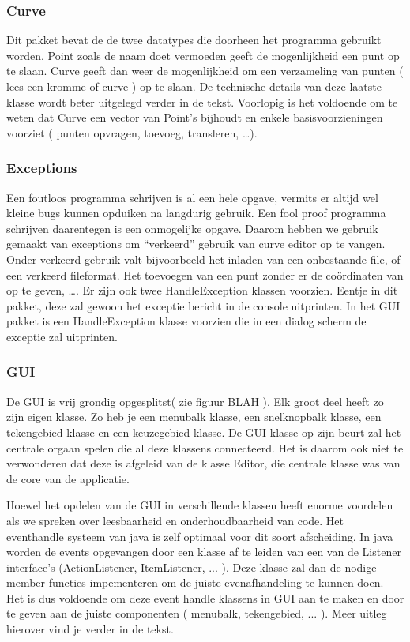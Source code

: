 \documentclass[a4paper,11pt,oneside, titlepage]{article}
\begin{document}
\subsubsection{Curve}
Dit pakket bevat de de twee datatypes die doorheen het programma gebruikt worden. Point zoals
de naam doet vermoeden geeft de mogenlijkheid een punt op te slaan. Curve geeft dan weer de
mogenlijkheid om een verzameling van punten ( lees een kromme of curve ) op te slaan. De
technische details van deze laatste klasse wordt beter uitgelegd verder in de tekst. 
Voorlopig is het voldoende om te weten dat Curve een vector van Point's bijhoudt en enkele
basisvoorzieningen voorziet ( punten opvragen, toevoeg, transleren, \ldots ).
\subsubsection{Exceptions}
Een foutloos programma schrijven is al een hele opgave, vermits er altijd wel kleine bugs
kunnen opduiken na langdurig gebruik. Een fool proof programma schrijven daarentegen is een
onmogelijke opgave. Daarom hebben we gebruik gemaakt van exceptions om ``verkeerd'' gebruik van
curve editor op te vangen. Onder verkeerd gebruik valt bijvoorbeeld het inladen van een
onbestaande file, of een verkeerd fileformat. Het toevoegen van een punt zonder er de 
co\"ordinaten van op te geven, \ldots.\newline \newline
Er zijn ook twee HandleException klassen voorzien. Eentje in dit pakket, deze zal gewoon 
het exceptie bericht in de console uitprinten. In het GUI pakket is een HandleException klasse
voorzien die in een dialog scherm de exceptie zal uitprinten.
\subsubsection{GUI}
De GUI is vrij grondig opgesplitst( zie figuur BLAH ). Elk groot deel heeft zo zijn eigen klasse.
Zo heb je een menubalk klasse, een snelknopbalk klasse, een tekengebied klasse en een keuzegebied
klasse. De GUI klasse op zijn beurt zal het centrale orgaan spelen die al deze klassens 
connecteerd. Het is daarom ook niet te verwonderen dat deze is afgeleid van de klasse Editor,
die centrale klasse was van de core van de applicatie. 

Hoewel het opdelen van de GUI in verschillende klassen heeft enorme voordelen als we spreken 
over leesbaarheid en onderhoudbaarheid van code. Het eventhandle systeem van java is zelf
optimaal voor dit soort afscheiding. In java worden de events opgevangen door een klasse 
af te leiden van een van de Listener interface's (ActionListener, ItemListener, ... ). Deze 
klasse zal dan de nodige member functies impementeren om de juiste evenafhandeling te kunnen
doen. Het is dus voldoende om deze event handle klassens in GUI aan te maken en door te geven
aan de juiste componenten ( menubalk, tekengebied, ... ). Meer uitleg hierover vind je verder in
de tekst.
\end{document}
